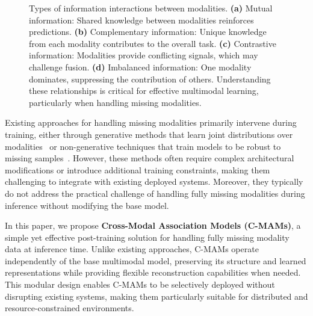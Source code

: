 \begin{figure}[b!]
    \caption{%
        Types of information interactions between modalities. 
        \textbf{(a)} Mutual information: Shared knowledge between modalities reinforces predictions.
        \textbf{(b)} Complementary information: Unique knowledge from each modality contributes to the overall task.
        \textbf{(c)} Contrastive information: Modalities provide conflicting signals, which may challenge fusion.
        \textbf{(d)} Imbalanced information: One modality dominates, suppressing the contribution of others.
        Understanding these relationships is critical for effective multimodal learning, particularly when handling missing modalities.
    }
    \label{fig:info_types}
\end{figure}

Existing approaches for handling missing modalities
primarily intervene during training,
either through generative methods
that learn joint distributions
over modalities~\cite{10.1145/3394486.3403182,YUAN2012622,10.1007/978-3-031-30675-4_19,9755996,Tran_2017_CVPR,8253467,9258396,smil,10.1145/3219819.3219963,10.1145/3474085.3475585,zhao-etal-2021-missing,wei2022perception,10.1145/3581783.3611696}
or non-generative techniques
that train models to be robust to missing samples~\cite{%
	ma2021maximum,Matsuura_2018_ECCV_Workshops,10.1145/3394486.3403234,7993002,QIAN2023443,hazarika2022analyzing}.
However,
these methods often require complex architectural modifications
or introduce additional training constraints,
making them challenging to integrate
with existing deployed systems.
Moreover,
they typically do not address
the practical challenge of handling
fully missing modalities during inference
without modifying the base model.

In this paper,
we propose \textbf{Cross-Modal Association Models (C-MAMs)},
a simple yet effective post-training solution
for handling fully missing modality data at inference time.
Unlike existing approaches,
C-MAMs operate independently of the base multimodal model,
preserving its structure and learned representations
while providing flexible reconstruction capabilities
when needed.
This modular design enables C-MAMs
to be selectively deployed
without disrupting existing systems,
making them particularly suitable
for distributed and resource-constrained environments.

